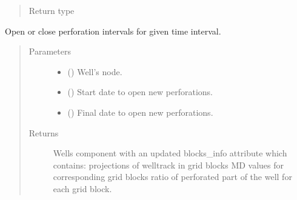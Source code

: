 \documentclass[letterpaper,10pt,english]{sphinxmanual}
\begin{document}
\begin{fulllineitems}
\begin{fulllineitems}
\begin{quote}
\begin{description}
\item[{Return type}] \leavevmode
{\hyperref[\detokenize{api/base_classes:geology.src.base_component.BaseComponent}]{}}

\end{description}\end{quote}

\end{fulllineitems}


\begin{fulllineitems}
\label{\detokenize{api/wells:geology.src.wells.Wells.apply_perforations}}
Open or close perforation intervals for given time interval.
\begin{quote}\begin{description}
\item[{Parameters}] \leavevmode\begin{itemize}
\item {} 
 ({\hyperref[\detokenize{api/wells:geology.src.wells.WellSegment}]{}}) \textendash{} Well’s node.

\item {} 
 (\sphinxstyleliteralemphasis{\sphinxupquote{, }}) \textendash{} Start date to open new perforations.

\item {} 
 (\sphinxstyleliteralemphasis{\sphinxupquote{, }}) \textendash{} Final date to open new perforations.

\end{itemize}

\item[{Returns}] \leavevmode
{} \textendash{} Wells component with an updated blocks\_info attribute which contains:
\sphinxhyphen{} projections of welltrack in grid blocks
\sphinxhyphen{} MD values for corresponding grid blocks
\sphinxhyphen{} ratio of perforated part of the well for each grid block.


\end{description}
\end{quote}
\end{fulllineitems}
\end{fulllineitems}
\end{document}
